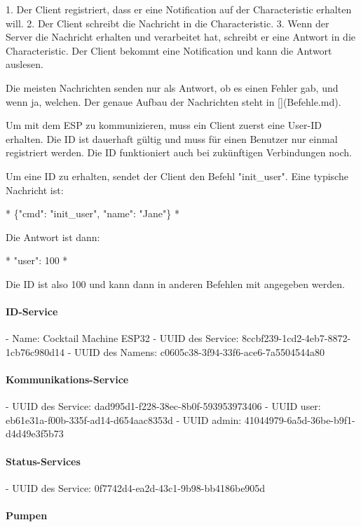 1. Der Client registriert, dass er eine Notification auf der Characteristic erhalten will.
2. Der Client schreibt die Nachricht in die Characteristic.
3. Wenn der Server die Nachricht erhalten und verarbeitet hat, schreibt er eine Antwort in die Characteristic. Der Client bekommt eine Notification und kann die Antwort auslesen.

Die meisten Nachrichten senden nur als Antwort, ob es einen Fehler gab, und wenn ja, welchen. Der genaue Aufbau der Nachrichten steht in [](Befehle.md).

Um mit dem ESP zu kommunizieren, muss ein Client zuerst eine User-ID erhalten. Die ID ist dauerhaft gültig und muss für einen Benutzer nur einmal registriert werden. Die ID funktioniert auch bei zukünftigen Verbindungen noch.

Um eine ID zu erhalten, sendet der Client den Befehl "init\_user". Eine typische Nachricht ist:

*
\{"cmd": "init\_user", "name": "Jane"\}
*

Die Antwort ist dann:

*
{"user": 100}
*

Die ID ist also 100 und kann dann in anderen Befehlen mit angegeben werden.

\paragraph{ID-Service}

- Name: Cocktail Machine ESP32
- UUID des Service: 8ccbf239-1cd2-4eb7-8872-1cb76c980d14
- UUID des Namens: c0605c38-3f94-33f6-ace6-7a5504544a80

\paragraph{Kommunikations-Service}

- UUID des Service: dad995d1-f228-38ec-8b0f-593953973406
- UUID user: eb61e31a-f00b-335f-ad14-d654aac8353d
- UUID admin: 41044979-6a5d-36be-b9f1-d4d49e3f5b73

\paragraph{Status-Services}

- UUID des Service: 0f7742d4-ea2d-43c1-9b98-bb4186be905d

\paragraph{Pumpen}

